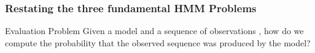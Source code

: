 \documentclass{beamer}
\begin{document}
\begin{frame}[T]
  \frametitle{Restating the three fundamental HMM Problems}
  
  \begin{block}{Evaluation Problem}
    Given a model  and a
    sequence of observations , how do we compute the probability
     that the
    observed sequence was produced by the model? \\
  \end{block}
\end{frame}
\end{document}
